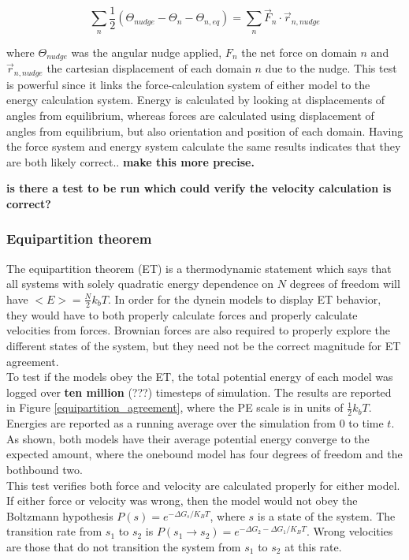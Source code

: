 \documentclass[10pt]{article} %
\begin{document}
\begin{equation}
  \sum_n \frac12 \left(\Theta_{nudge} - \Theta_{n} - \Theta_{n,eq}\right) = \sum_n \vec{F}_n \cdot \vec{r}_{n,nudge}
\end{equation}

where $\Theta_{nudge}$ was the angular nudge applied, $F_n$ the net force on domain $n$ and $\vec{r}_{n,nudge}$ the cartesian displacement of each domain $n$ due to the nudge. This test is powerful since it links the force-calculation system of either model to the energy calculation system. Energy is calculated by looking at displacements of angles from equilibrium, whereas forces are calculated using displacement of angles from equilibrium, but also orientation and position of each domain. Having the force system and energy system calculate the same results indicates that they are both likely correct.. \textbf{make this more precise.}

\textbf{is there a test to be run which could verify the velocity calculation is correct?}

\subsubsection{Equipartition theorem}
The equipartition theorem (ET) is a thermodynamic statement which says that all systems with solely quadratic energy dependence on $N$ degrees of freedom will have $<E> = \frac N2 k_bT$. In order for the dynein models to display ET behavior, they would have to both properly calculate forces and properly calculate velocities from forces. Brownian forces are also required to properly explore the different states of the system, but they need not be the correct magnitude for ET agreement.\\

To test if the models obey the ET, the total potential energy of each model was logged over \textbf{ten million} (???) timesteps of simulation. The results are reported in Figure \ref{equipartition_agreement}, where the PE scale is in units of $\frac12 k_bT$. Energies are reported as a running average over the simulation from 0 to time $t$. As shown, both models have their average potential energy converge to the expected amount, where the onebound model has four degrees of freedom and the bothbound two.\\

This test verifies both force and velocity are calculated properly for either model. If either force or velocity was wrong, then the model would not obey the Boltzmann hypothesis $P(s) = e^{-\Delta G_{s}/K_BT}$, where $s$ is a state of the system. The transition rate from $s_1$ to $s_2$ is $P(s_1\rightarrow s_2) = e^{-{\Delta G_2 - \Delta G_1}/K_BT}$. Wrong velocities are those that do not transition the system from $s_1$ to $s_2$ at this rate.\\
\end{document}
